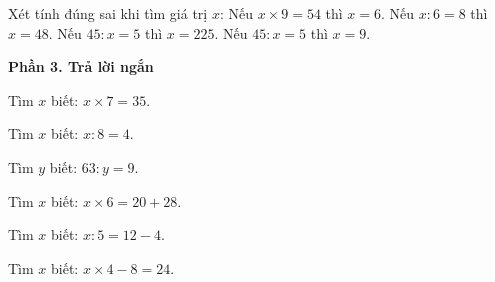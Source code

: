 \begin{ex} %
Xét tính đúng sai khi tìm giá trị $x$:
\choiceTF
{\True Nếu $x \times 9 = 54$ thì $x = 6$.}
{\True Nếu $x : 6 = 8$ thì $x = 48$.}
{Nếu $45 : x = 5$ thì $x = 225$.}
{\True Nếu $45 : x = 5$ thì $x = 9$.}
\end{ex}

\textbf{Phần 3. Trả lời ngắn}

\begin{ex} %
Tìm $x$ biết: $x \times 7 = 35$.
\end{ex}

\begin{ex} %
Tìm $x$ biết: $x : 8 = 4$.
\end{ex}

\begin{ex} %
Tìm $y$ biết: $63 : y = 9$.
\end{ex}

\begin{ex} %
Tìm $x$ biết: $x \times 6 = 20 + 28$.
\end{ex}

\begin{ex} %
Tìm $x$ biết: $x : 5 = 12 - 4$.
\end{ex}

\begin{ex} %
Tìm $x$ biết: $x \times 4 - 8 = 24$.
\end{ex}
